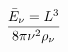 \documentclass[preview]{standalone}
\begin{document}
\begin{align*}
\bar{E}_{\nu}={ L ^{3} } \over {8 \pi \nu^{2}} \rho_{\nu}
\end{align*}
\end{document}
